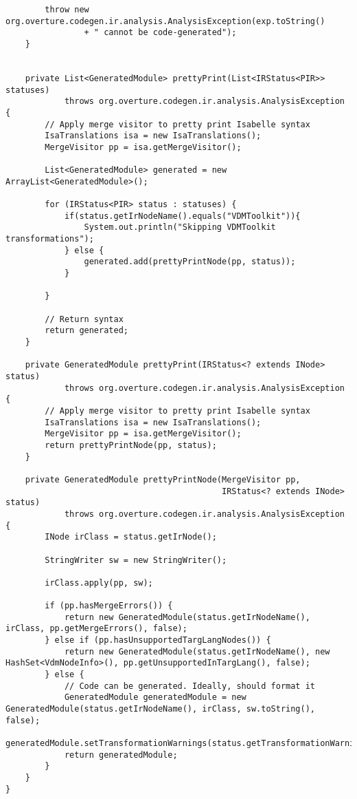 \begin{appendices}
\begin{lstlisting}
        throw new org.overture.codegen.ir.analysis.AnalysisException(exp.toString()
                + " cannot be code-generated");
    }


    private List<GeneratedModule> prettyPrint(List<IRStatus<PIR>> statuses)
            throws org.overture.codegen.ir.analysis.AnalysisException {
        // Apply merge visitor to pretty print Isabelle syntax
        IsaTranslations isa = new IsaTranslations();
        MergeVisitor pp = isa.getMergeVisitor();

        List<GeneratedModule> generated = new ArrayList<GeneratedModule>();

        for (IRStatus<PIR> status : statuses) {
            if(status.getIrNodeName().equals("VDMToolkit")){
                System.out.println("Skipping VDMToolkit transformations");
            } else {
                generated.add(prettyPrintNode(pp, status));
            }

        }

        // Return syntax
        return generated;
    }

    private GeneratedModule prettyPrint(IRStatus<? extends INode> status)
            throws org.overture.codegen.ir.analysis.AnalysisException {
        // Apply merge visitor to pretty print Isabelle syntax
        IsaTranslations isa = new IsaTranslations();
        MergeVisitor pp = isa.getMergeVisitor();
        return prettyPrintNode(pp, status);
    }

    private GeneratedModule prettyPrintNode(MergeVisitor pp,
                                            IRStatus<? extends INode> status)
            throws org.overture.codegen.ir.analysis.AnalysisException {
        INode irClass = status.getIrNode();

        StringWriter sw = new StringWriter();

        irClass.apply(pp, sw);

        if (pp.hasMergeErrors()) {
            return new GeneratedModule(status.getIrNodeName(), irClass, pp.getMergeErrors(), false);
        } else if (pp.hasUnsupportedTargLangNodes()) {
            return new GeneratedModule(status.getIrNodeName(), new HashSet<VdmNodeInfo>(), pp.getUnsupportedInTargLang(), false);
        } else {
            // Code can be generated. Ideally, should format it
            GeneratedModule generatedModule = new GeneratedModule(status.getIrNodeName(), irClass, sw.toString(), false);
            generatedModule.setTransformationWarnings(status.getTransformationWarnings());
            return generatedModule;
        }
    }
}
\end{lstlisting}


\end{appendices}
